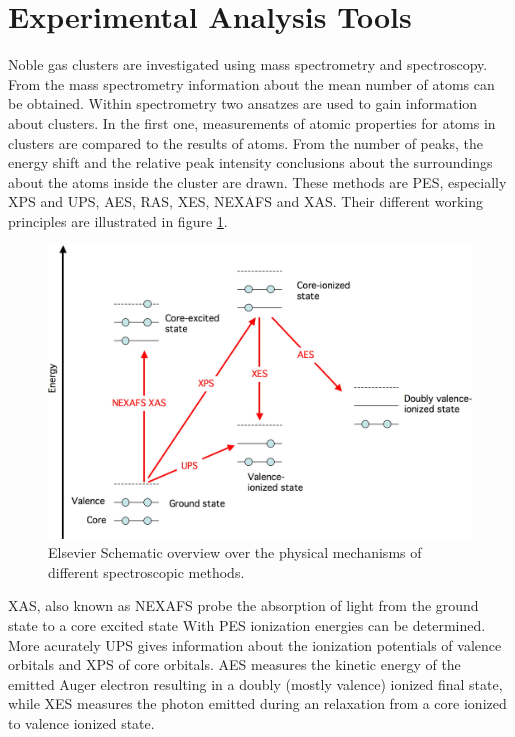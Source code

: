 \section{Experimental Analysis Tools}
Noble gas clusters are investigated using mass spectrometry and spectroscopy.
From the mass spectrometry information about the mean number of atoms
can be obtained. Within spectrometry two ansatzes are used
to gain information about clusters. In the first one, measurements of
atomic properties for atoms in clusters are compared to the results of
atoms. From the number of peaks, the energy shift and the relative peak
intensity conclusions about the surroundings about the atoms inside
the cluster are drawn. These methods are \ac{PES}, especially \ac{XPS}
and \ac{UPS}, \ac{AES}, \ac{RAS}, \ac{XES}, \ac{NEXAFS} and \ac{XAS}.
Their different working principles are illustrated in figure
\ref{figure:overview_spectroscopies}.

\begin{figure}[h]
  \centering
  \includegraphics[scale=1.0]{pics/overview_spectroscopies.jpeg}
  \caption{Elsevier Schematic overview over the physical mechanisms of different
           spectroscopic methods.}
  \label{figure:overview_spectroscopies}
\end{figure}

\ac{XAS}, also known as \ac{NEXAFS} probe the absorption of light
from the ground state to a core excited state With \ac{PES} ionization
energies can be determined. More acurately \ac{UPS} gives information
about the ionization potentials of valence orbitals and \ac{XPS}
of core orbitals.
\ac{AES} measures the kinetic energy of the emitted Auger electron
resulting in a doubly (mostly valence) ionized final state, while
\ac{XES} measures the photon emitted during an relaxation from
a core ionized to valence ionized state.

